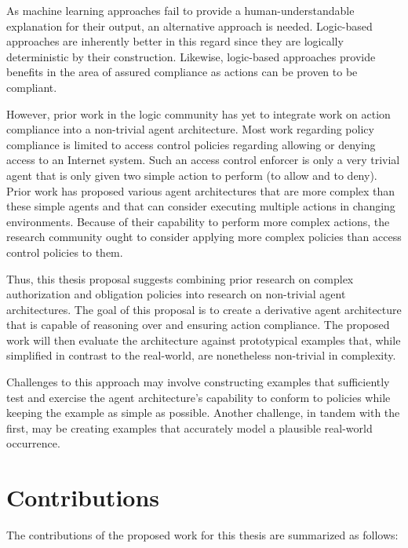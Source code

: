 As machine learning approaches fail to provide a human-understandable explanation for their output, an alternative approach is needed.
Logic-based approaches are inherently better in this regard since they are logically deterministic by their construction.
Likewise, logic-based approaches provide benefits in the area of assured compliance as actions can be proven to be compliant.

However, prior work in the logic community has yet to integrate work on action compliance into a non-trivial agent architecture.
Most work regarding policy compliance is limited to access control policies regarding allowing or denying access to an Internet system.
Such an access control enforcer is only a very trivial agent that is only given two simple action to perform (to allow and to deny).
Prior work has proposed various agent architectures that are more complex than these simple agents and that can consider executing multiple actions in changing environments.
Because of their capability to perform more complex actions, the research community ought to consider applying more complex policies than access control policies to them.

Thus, this thesis proposal suggests combining prior research on complex authorization and obligation policies into research on non-trivial agent architectures.
The goal of this proposal is to create a derivative agent architecture that is capable of reasoning over and ensuring action compliance.
The proposed work will then evaluate the architecture against prototypical examples that, while simplified in contrast to the real-world, are nonetheless non-trivial in complexity.

Challenges to this approach may involve constructing examples that sufficiently test and exercise the agent architecture's capability to conform to policies while keeping the example as simple as possible.
Another challenge, in tandem with the first, may be creating examples that accurately model a plausible real-world occurrence.

\section{Contributions}

The contributions of the proposed work for this thesis are summarized as follows:

